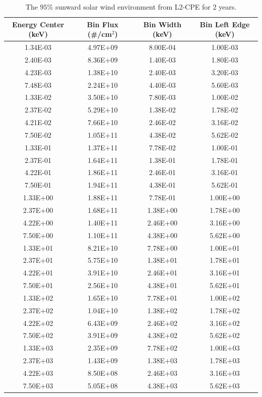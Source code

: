 \documentclass{hitec}
\begin{document}
\begin{table}[!h]\centering
	\caption{The $95\%$ sunward solar wind environment from L2-CPE for 2 years.}\label{tab:p95_sunward_solarwind_IMP}
	\begin{tabular}{|c | c | c | c |}\hline
		Energy Center (keV) & Bin Flux (\#/cm$^2$) & Bin Width (keV) & Bin Left Edge (keV) \\\hline
1.34E-03&4.97E+09&8.00E-04&1.00E-03\\\hline
2.40E-03&8.36E+09&1.40E-03&1.80E-03\\\hline
4.23E-03&1.38E+10&2.40E-03&3.20E-03\\\hline
7.48E-03&2.24E+10&4.40E-03&5.60E-03\\\hline
1.33E-02&3.50E+10&7.80E-03&1.00E-02\\\hline
2.37E-02&5.29E+10&1.38E-02&1.78E-02\\\hline
4.21E-02&7.66E+10&2.46E-02&3.16E-02\\\hline
7.50E-02&1.05E+11&4.38E-02&5.62E-02\\\hline
1.33E-01&1.37E+11&7.78E-02&1.00E-01\\\hline
2.37E-01&1.64E+11&1.38E-01&1.78E-01\\\hline
4.22E-01&1.86E+11&2.46E-01&3.16E-01\\\hline
7.50E-01&1.94E+11&4.38E-01&5.62E-01\\\hline
1.33E+00&1.88E+11&7.78E-01&1.00E+00\\\hline
2.37E+00&1.68E+11&1.38E+00&1.78E+00\\\hline
4.22E+00&1.40E+11&2.46E+00&3.16E+00\\\hline
7.50E+00&1.10E+11&4.38E+00&5.62E+00\\\hline
1.33E+01&8.21E+10&7.78E+00&1.00E+01\\\hline
2.37E+01&5.75E+10&1.38E+01&1.78E+01\\\hline
4.22E+01&3.91E+10&2.46E+01&3.16E+01\\\hline
7.50E+01&2.56E+10&4.38E+01&5.62E+01\\\hline
1.33E+02&1.65E+10&7.78E+01&1.00E+02\\\hline
2.37E+02&1.04E+10&1.38E+02&1.78E+02\\\hline
4.22E+02&6.43E+09&2.46E+02&3.16E+02\\\hline
7.50E+02&3.91E+09&4.38E+02&5.62E+02\\\hline
1.33E+03&2.35E+09&7.78E+02&1.00E+03\\\hline
2.37E+03&1.43E+09&1.38E+03&1.78E+03\\\hline
4.22E+03&8.50E+08&2.46E+03&3.16E+03\\\hline
7.50E+03&5.05E+08&4.38E+03&5.62E+03\\\hline
	\end{tabular}
\end{table}
\clearpage %
\end{document}
